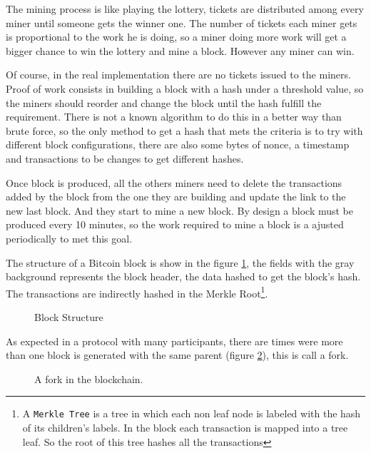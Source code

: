 The mining process is like playing the lottery, tickets are distributed  among
  every miner until someone gets the winner one. The number of tickets each
  miner gets is proportional to the work he is doing, so a miner doing more work
  will get a bigger chance to win the lottery and mine a block. However any miner
  can win.

Of course, in the real implementation there are no tickets issued to the
  miners.
Proof of work consists in building a block with a hash under a threshold value,
  so the miners should reorder and change the block until the hash fulfill the
  requirement.
There is not a known algorithm to do this in a better way than
  brute force, so the only method to get a hash that mets the criteria is to try
  with different block configurations, there are also some bytes of nonce, a
  timestamp and transactions to be changes to get different hashes.

Once block is produced, all the others miners need to delete the transactions
  added by the block from the one they are building and update the link to the
  new last block. And they start to mine a new block.
By design a block must be produced every 10 minutes, so the work required to
  mine a block is a ajusted periodically to met this goal.

The structure of a Bitcoin block is show in the figure \ref{fig:block_pow}, the
  fields with the gray background represents the block header, the data hashed
  to get the block's hash.
The transactions are indirectly hashed in the Merkle Root\footnote{A
  \texttt{Merkle Tree} is a tree in which each non leaf node is labeled with
  the hash of its children's labels. In the block each transaction is mapped
  into a tree leaf. So the root of this tree hashes all the transactions}.

  \begin{figure}[ht]
	\centering
	
	\caption{Block Structure}
	\label{fig:block_pow}
\end{figure}

As expected in a protocol with many participants, there are times were more
  than one block is generated with the same parent (figure
  \ref{fig:chain_fork}), this is call a fork.

\begin{figure}
	\centering
	\def\svgwidth{\columnwidth}
	
	\caption{A fork in the blockchain.}
	\label{fig:chain_fork}
\end{figure}

